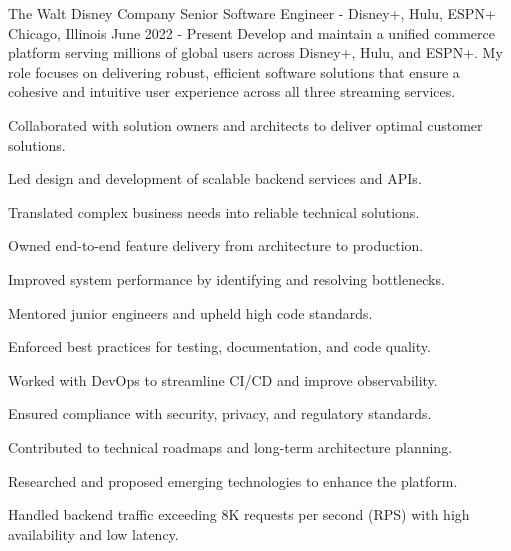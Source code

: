 
\begin{cventries}

  \experienceentry
  {The Walt Disney Company} %
    {Senior Software Engineer - Disney+, Hulu, ESPN+} %
    {Chicago, Illinois} %
    {June 2022 - Present} %
    {Develop and maintain a unified commerce platform serving millions of global users across Disney+, Hulu, and ESPN+. My role focuses on delivering robust, efficient software solutions that ensure a cohesive and intuitive user experience across all three streaming services.}
    {
      \begin{cvitems} %
      	\item {Collaborated with solution owners and architects to deliver optimal customer solutions.}
      	\item {Led design and development of scalable backend services and APIs.}
		\item {Translated complex business needs into reliable technical solutions.}
		\item {Owned end-to-end feature delivery from architecture to production.}
		\item {Improved system performance by identifying and resolving bottlenecks.}
		\item {Mentored junior engineers and upheld high code standards.}
		\item {Enforced best practices for testing, documentation, and code quality.}
		\item {Worked with DevOps to streamline CI/CD and improve observability.}
		\item {Ensured compliance with security, privacy, and regulatory standards.}
		\item {Contributed to technical roadmaps and long-term architecture planning.}
		\item {Researched and proposed emerging technologies to enhance the platform.}
		\item {Handled backend traffic exceeding 8K requests per second (RPS) with high availability and low latency.}

\end{cvitems}}
\end{cventries}
